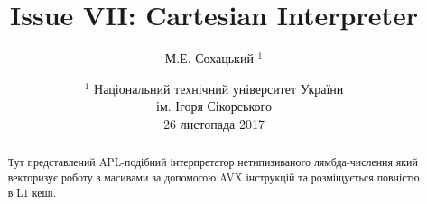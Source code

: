 \documentclass{article}
\begin{document}
\author { М.Е. Сохацький $^1$ }
\title { Issue VII: Cartesian Interpreter }
\date{ \small $^1$ Національний технічний університет України \\
       ім. Ігоря Сікорського \\
       26 листопада 2017 }
\maketitle

\begin{abstract}
Тут представлений APL-подібний інтерпретатор нетипизиваного лямбда-числення
який векторизує роботу з масивами за допомогою AVX інструкцій та
розміщується повністю в L1 кеші.

\end{abstract}
\end{document}
